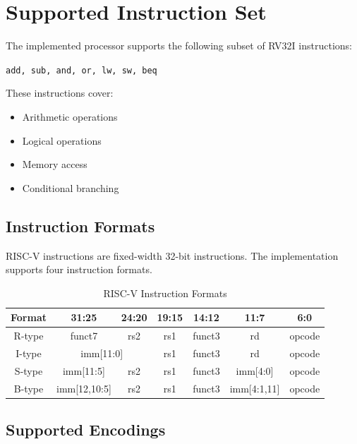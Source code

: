 \documentclass[10pt,a4paper,twocolumn]{article}
\begin{document}
\section{Supported Instruction Set}

The implemented processor supports the following subset of RV32I instructions:

\begin{center}
\texttt{add, sub, and, or, lw, sw, beq}
\end{center}

These instructions cover:

\begin{itemize}
    \item Arithmetic operations
    \item Logical operations
    \item Memory access
    \item Conditional branching
\end{itemize}

\subsection{Instruction Formats}

RISC-V instructions are fixed-width 32-bit instructions. The implementation supports four instruction formats.

\begin{table}[t]
\centering
\caption{RISC-V Instruction Formats}
\label{tab:formats}

\begin{tabular}{|c|c|c|c|c|c|c|}
\hline
\textbf{Format} & \textbf{31:25} & \textbf{24:20} & \textbf{19:15} & \textbf{14:12} & \textbf{11:7} & \textbf{6:0} \\
\hline
R-type & funct7 & rs2 & rs1 & funct3 & rd & opcode \\
\hline
I-type & \multicolumn{2}{c|}{imm[11:0]} & rs1 & funct3 & rd & opcode \\
\hline
S-type & imm[11:5] & rs2 & rs1 & funct3 & imm[4:0] & opcode \\
\hline
B-type & imm[12,10:5] & rs2 & rs1 & funct3 & imm[4:1,11] & opcode \\
\hline
\end{tabular}
\end{table}

\subsection{Supported Encodings}
\end{document}
